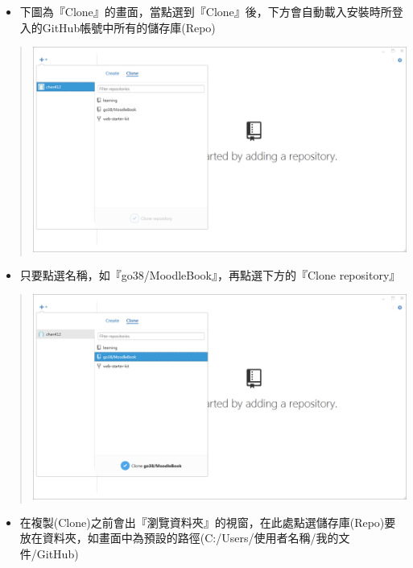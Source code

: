 \documentclass[letterpaper,10pt,english]{sphinxmanual}
\begin{document}
\begin{itemize}
\item {} 
下圖為『Clone』的畫面，當點選到『Clone』後，下方會自動載入安裝時所登入的GitHub帳號中所有的儲存庫(Repo)

\end{itemize}
\begin{quote}

\includegraphics{GitHub-Clone-003.png}
\end{quote}
\begin{itemize}
\item {} 
只要點選名稱，如『go38/MoodleBook』，再點選下方的『Clone repository』

\end{itemize}
\begin{quote}

\includegraphics{GitHub-Clone-004.png}
\end{quote}
\begin{itemize}
\item {} 
在複製(Clone)之前會出『瀏覽資料夾』的視窗，在此處點選儲存庫(Repo)要放在資料夾，如畫面中為預設的路徑(C:/Users/使用者名稱/我的文件/GitHub)

\end{itemize}
\end{document}
